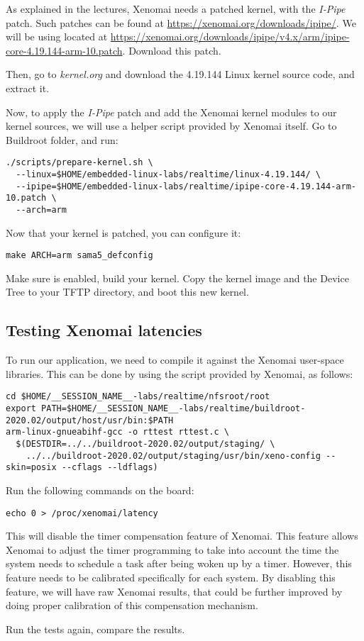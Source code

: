 As explained in the lectures, Xenomai needs a patched kernel, with the
{\em I-Pipe} patch. Such patches can be found at
\url{https://xenomai.org/downloads/ipipe/}. We will be using
 located at
\url{https://xenomai.org/downloads/ipipe/v4.x/arm/ipipe-core-4.19.144-arm-10.patch}. Download
this patch.

Then, go to {\em kernel.org} and download the 4.19.144 Linux kernel
source code, and extract it.

Now, to apply the {\em I-Pipe} patch and add the Xenomai kernel
modules to our kernel sources, we will use a helper script provided by
Xenomai itself. Go to Buildroot 
folder, and run:

\begin{verbatim}
./scripts/prepare-kernel.sh \
  --linux=$HOME/embedded-linux-labs/realtime/linux-4.19.144/ \
  --ipipe=$HOME/embedded-linux-labs/realtime/ipipe-core-4.19.144-arm-10.patch \
  --arch=arm
\end{verbatim}

Now that your kernel is patched, you can configure it:

\begin{verbatim}
make ARCH=arm sama5_defconfig
\end{verbatim}

Make sure  is enabled, build your kernel. Copy
the kernel image and the Device Tree to your TFTP directory, and boot
this new kernel.

\subsection{Testing Xenomai latencies}

To run our  application, we need to compile it against
the Xenomai user-space libraries. This can be done by using the
 script provided by Xenomai, as follows:

\small
\begin{verbatim}
cd $HOME/__SESSION_NAME__-labs/realtime/nfsroot/root
export PATH=$HOME/__SESSION_NAME__-labs/realtime/buildroot-2020.02/output/host/usr/bin:$PATH
arm-linux-gnueabihf-gcc -o rttest rttest.c \
  $(DESTDIR=../../buildroot-2020.02/output/staging/ \
    ../../buildroot-2020.02/output/staging/usr/bin/xeno-config --skin=posix --cflags --ldflags)
\end{verbatim}
\normalsize

Run the following commands on the board:

\begin{verbatim}
echo 0 > /proc/xenomai/latency
\end{verbatim}

This will disable the timer compensation feature of Xenomai. This
feature allows Xenomai to adjust the timer programming to take into
account the time the system needs to schedule a task after being woken
up by a timer. However, this feature needs to be calibrated
specifically for each system. By disabling this feature, we will have
raw Xenomai results, that could be further improved by doing proper
calibration of this compensation mechanism.

Run the tests again, compare the results.

